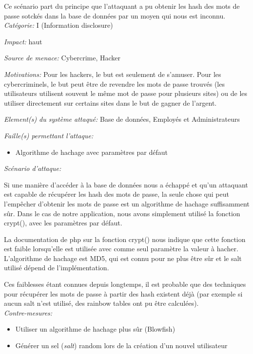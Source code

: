 \documentclass{article}
\begin{document}
Ce scénario part du principe que l'attaquant a pu obtenir les hash des
mots de passe sotckés dans la base de données par un moyen qui nous est
inconnu.\\

\textit{Catégorie:} I (Information disclosure)

\textit{Impact:} haut

\textit{Source de menace:} Cybercrime, Hacker

\textit{Motivations:} Pour les hackers, le but est seulement de s'amuser. Pour les cybercriminels, le but peut être de revendre les mots de
  passe trouvés (les utilisateurs utilisent souvent le même mot de passe
  pour plusieurs sites) ou de les utiliser directement sur certains
  sites dans le but de gagner de l'argent.
  
\textit{Element(s) du système attaqué:} Base de données, Employés et
Administrateurs

\textit{Faille(s) permettant l'attaque:}

\begin{itemize}

\item
  Algorithme de hachage avec paramètres par défaut
\end{itemize}

\textit{Scénario d'attaque:}

Si une manière d'accéder à la base de données nous a échappé et qu'un
attaquant est capable de récupérer les hash des mots de passe, la seule
chose qui peut l'empêcher d'obtenir les mots de passe est un algorithme
de hachage suffisamment sûr. Dans le cas de notre application, nous
avons simplement utilisé la fonction crypt(), avec les paramètres par
défaut.

La documentation de php sur la fonction crypt() nous indique que cette
fonction est faible lorsqu'elle est utilisée avec comme seul paramètre
la valeur à hacher. L'algorithme de hachage est MD5, qui est connu pour
ne plus être sûr et le salt utilisé dépend de l'implémentation.

Ces faiblesses étant connues depuis longtemps, il est probable que des
techniques pour récupérer les mots de passe à partir des hash existent
déjà (par exemple si aucun salt n'est utilisé, des rainbow tables ont pu
être calculées).\\

\textit{Contre-mesures:}

\begin{itemize}

\item
  Utiliser un algorithme de hachage plus sûr (Blowfish)
\item
  Générer un sel (\emph{salt}) random lors de la création d'un nouvel
  utilisateur
\end{itemize}
\end{document}
